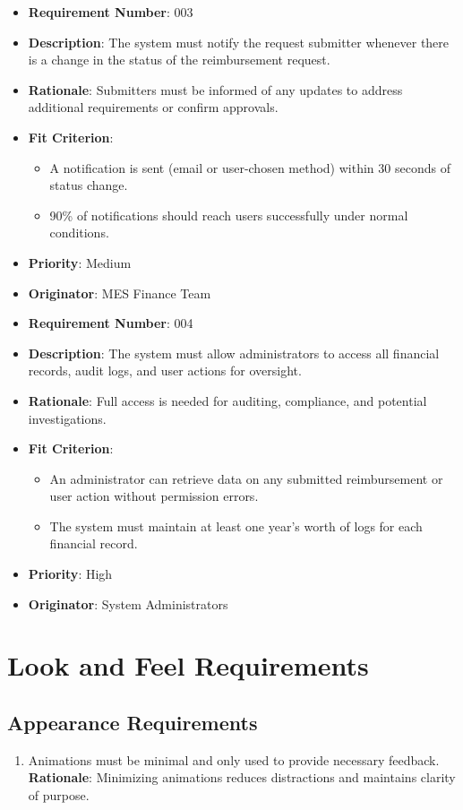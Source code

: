 \documentclass[12pt]{article}
\begin{document}
\begin{itemize}
  \item \textbf{Requirement Number}: 003  
  \item \textbf{Description}: The system must notify the request submitter whenever there is a change in the status of the reimbursement request.  
  \item \textbf{Rationale}: Submitters must be informed of any updates to address additional requirements or confirm approvals.  
  \item \textbf{Fit Criterion}:  
  \begin{itemize}
    \item A notification is sent (email or user-chosen method) within 30 seconds of status change.
    \item 90\% of notifications should reach users successfully under normal conditions.
  \end{itemize}
  \item \textbf{Priority}: Medium  
  \item \textbf{Originator}: MES Finance Team

  \bigskip

  \item \textbf{Requirement Number}: 004  
  \item \textbf{Description}: The system must allow administrators to access all financial records, audit logs, and user actions for oversight.  
  \item \textbf{Rationale}: Full access is needed for auditing, compliance, and potential investigations.  
  \item \textbf{Fit Criterion}:  
  \begin{itemize}
    \item An administrator can retrieve data on any submitted reimbursement or user action without permission errors.
    \item The system must maintain at least one year’s worth of logs for each financial record.
  \end{itemize}
  \item \textbf{Priority}: High  
  \item \textbf{Originator}: System Administrators
  
\end{itemize}

\section{Look and Feel Requirements}
\subsection{Appearance Requirements}
\begin{enumerate}
  \item Animations must be minimal and only used to provide necessary feedback. \\
  \textbf{Rationale}: Minimizing animations reduces distractions and maintains clarity of purpose.
\end{enumerate}
\end{document}

